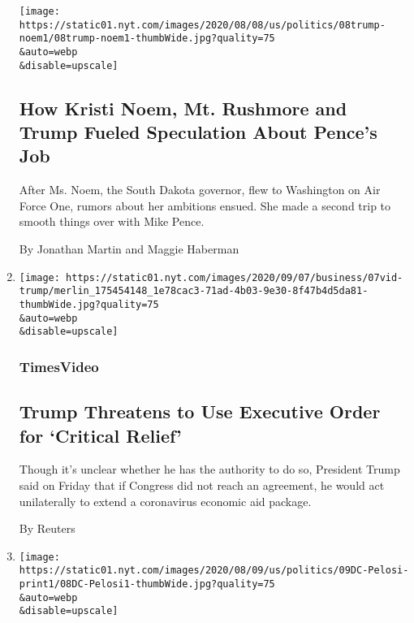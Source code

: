 \begin{enumerate}
  \texttt{[image: https://static01.nyt.com/images/2020/08/08/us/politics/08trump-noem1/08trump-noem1-thumbWide.jpg?quality=75\\\&auto=webp\\\&disable=upscale]}

  \hypertarget{how-kristi-noem-mt-rushmore-and-trump-fueled-speculation-about-pences-job}{%
  \subsection{How Kristi Noem, Mt. Rushmore and Trump Fueled Speculation
  About Pence's
  Job}\label{how-kristi-noem-mt-rushmore-and-trump-fueled-speculation-about-pences-job}}

  After Ms. Noem, the South Dakota governor, flew to Washington on Air
  Force One, rumors about her ambitions ensued. She made a second trip
  to smooth things over with Mike Pence.

  By Jonathan Martin and Maggie Haberman
\item
  \href{/video/us/politics/100000007279339/trump-says-he-will-act-on-his-own-if-congress-doesnt-agree-on-relief.html}{}

  \texttt{[image: https://static01.nyt.com/images/2020/09/07/business/07vid-trump/merlin\_175454148\_1e78cac3-71ad-4b03-9e30-8f47b4d5da81-thumbWide.jpg?quality=75\\\&auto=webp\\\&disable=upscale]}

  \hypertarget{timesvideo-1}{%
  \subsubsection{TimesVideo}\label{timesvideo-1}}

  \hypertarget{trump-threatens-to-use-executive-order-for-critical-relief}{%
  \subsection{Trump Threatens to Use Executive Order for `Critical
  Relief'}\label{trump-threatens-to-use-executive-order-for-critical-relief}}

  Though it's unclear whether he has the authority to do so, President
  Trump said on Friday that if Congress did not reach an agreement, he
  would act unilaterally to extend a coronavirus economic aid package.

  By Reuters
\item
  \href{/2020/08/08/us/politics/nancy-pelosi-coronavirus-relief.html}{}

  \texttt{[image: https://static01.nyt.com/images/2020/08/09/us/politics/09DC-Pelosi-print1/08DC-Pelosi1-thumbWide.jpg?quality=75\\\&auto=webp\\\&disable=upscale]}


\end{enumerate}
